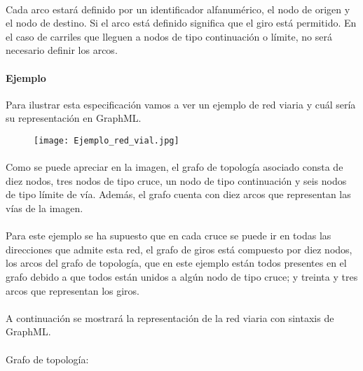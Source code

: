 	\paragraph{}
	Cada arco estará definido por un identificador alfanumérico, el nodo de origen y el nodo de destino. Si el arco está definido significa que el giro está permitido. En el caso de carriles que lleguen a nodos de tipo continuación o límite, no será necesario definir los arcos.
	
	\paragraph{Ejemplo}
	Para ilustrar esta especificación vamos a ver un ejemplo de red viaria y cuál sería su representación en GraphML.
	
	\begin{figure}[H]
		\centering
			\texttt{[image: Ejemplo\_red\_vial.jpg]}
	\end{figure}
	
	\paragraph{}
	Como se puede apreciar en la imagen, el grafo de topología asociado consta de diez nodos, tres nodos de tipo cruce, un nodo de tipo continuación y seis nodos de tipo límite de vía. Además, el grafo cuenta con diez arcos que representan las vías de la imagen.
	
	\paragraph{}
	Para este ejemplo se ha supuesto que en cada cruce se puede ir en todas las direcciones que admite esta red, el grafo de giros está compuesto por diez nodos, los arcos del grafo de topología, que en este ejemplo están todos presentes en el grafo debido a que todos están unidos a algún nodo de tipo cruce; y treinta y tres arcos que representan los giros.
	
	\paragraph{}
	A continuación se mostrará la representación de la red viaria con sintaxis de GraphML.
	
	\paragraph{}
	Grafo de topología:
	\tiny
	
	\normalsize
